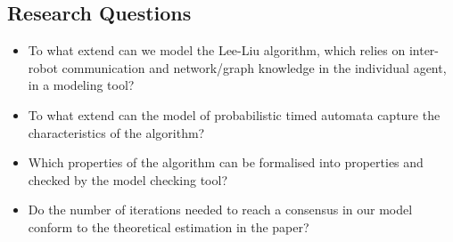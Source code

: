 \subsection{Research Questions}


\begin{itemize}
    \item To what extend can we model the Lee-Liu algorithm, which relies on inter-robot communication and network/graph knowledge in the individual agent, in a modeling tool?
    \item To what extend can the model of probabilistic timed automata capture the characteristics of the algorithm?
    \item Which properties of the algorithm can be formalised into properties and checked by the model checking tool?
    \item Do the number of iterations needed to reach a consensus in our model conform to the theoretical estimation in the paper?
\end{itemize}
